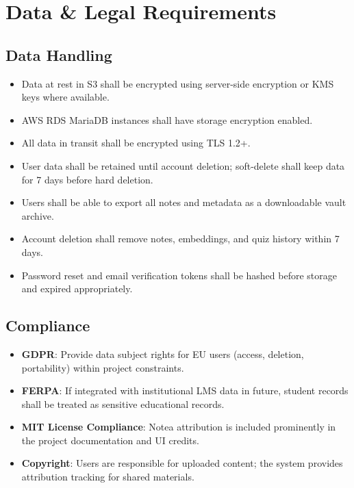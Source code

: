 \documentclass[12pt,a4paper]{article}
\begin{document}
\section{Data \& Legal Requirements}

\subsection{Data Handling}

\begin{itemize}
    \item Data at rest in S3 shall be encrypted using server-side encryption or KMS keys where available.
    \item AWS RDS MariaDB instances shall have storage encryption enabled.
    \item All data in transit shall be encrypted using TLS 1.2+.
    \item User data shall be retained until account deletion; soft-delete shall keep data for 7 days before hard deletion.
    \item Users shall be able to export all notes and metadata as a downloadable vault archive.
    \item Account deletion shall remove notes, embeddings, and quiz history within 7 days.
    \item Password reset and email verification tokens shall be hashed before storage and expired appropriately.
\end{itemize}

\subsection{Compliance}

\begin{itemize}
    \item \textbf{GDPR}: Provide data subject rights for EU users (access, deletion, portability) within project constraints.
    \item \textbf{FERPA}: If integrated with institutional LMS data in future, student records shall be treated as sensitive educational records.
    \item \textbf{MIT License Compliance}: Notea attribution is included prominently in the project documentation and UI credits.
    \item \textbf{Copyright}: Users are responsible for uploaded content; the system provides attribution tracking for shared materials.
\end{itemize}
\end{document}

